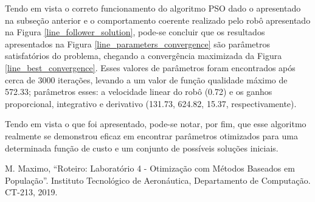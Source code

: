 \documentclass[conference]{IEEEtran}
\begin{document}
Tendo em vista o correto funcionamento do algoritmo PSO dado o apresentado na subseção anterior e o comportamento coerente realizado pelo robô apresentado na Figura \ref{line_follower_solution}, pode-se concluir que os resultados apresentados na Figura \ref{line_parameters_convergence} são parâmetros satisfatórios do problema, chegando a convergência maximizada da Figura \ref{line_best_convergence}. Esses valores de parâmetros foram encontrados após cerca de 3000 iterações, levando a um valor de função qualidade máximo de 572.33; parâmetros esses: a velocidade linear do robô (0.72) e os ganhos proporcional, integrativo e derivativo (131.73, 624.82, 15.37, respectivamente).

Tendo em vista o que foi apresentado, pode-se notar, por fim, que esse algoritmo realmente se demonstrou eficaz em encontrar parâmetros otimizados para uma determinada função de custo e um conjunto de possíveis soluções iniciais.

\begin{thebibliography}{00}
 M. Maximo, ``Roteiro: Laboratório 4 - Otimização com Métodos Baseados em População''. Instituto Tecnológico de Aeronáutica, Departamento de Computação. CT-213, 2019.
\end{thebibliography}
\end{document}
